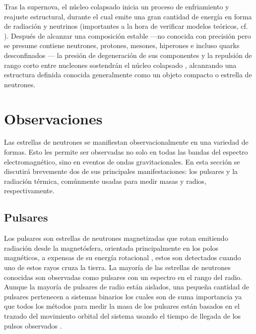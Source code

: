 Tras la supernova, el núcleo colapsado   inicia un proceso de enfriamiento y reajuste estructural, durante el cual emite una gran cantidad de energía en forma de radiación y neutrinos (importantes a la hora de verificar modelos teóricos, cf. \cite{Alvarez-Salazar2018}). Después de alcanzar una composición estable —no conocida con precisión pero se presume contiene neutrones, protones, mesones, hiperones e incluso quarks desconfinados \cite{Lattimer2004}— la presión de degeneración de sus componentes y la repulsión de rango corto entre nucleones sostendrán el núcleo colapsado \cite{Glendenning2000}, alcanzando una estructura definida conocida generalmente como un objeto compacto o estrella de neutrones.

\section{Observaciones}\label{ObsMan}

\noindent Las estrellas de neutrones se manifiestan observacionalmente en una variedad de formas. Esto les permite ser observadas no solo en todas las bandas del espectro electromagnético, sino en eventos de ondas gravitacionales. En esta sección se discutirá brevemente dos de sus principales manifestaciones: los pulsares y la radiación térmica, comúnmente usadas para medir masas y radios, respectivamente.

\subsection{Pulsares}

\noindent Los pulsares son estrellas de neutrones magnetizadas que rotan emitiendo radiación desde la magnetósfera, orientada principalmente en los polos magnéticos, a expensas de su energía rotacional \cite{Becker2009}, estos son detectados cuando uno de estos rayos cruza la tierra. La mayoría de las estrellas de neutrones conocidas son observadas como pulsares con un espectro en el rango del radio. Aunque la mayoría de pulsares de radio están aislados, una pequeña cantidad de pulsares pertenecen a sistemas binarios los cuales son de suma importancia ya que todos los métodos para medir la masa de los pulsares están basados en el trazado del movimiento orbital del sistema usando el tiempo de llegada de los pulsos observados \cite{Ozel2016}.

